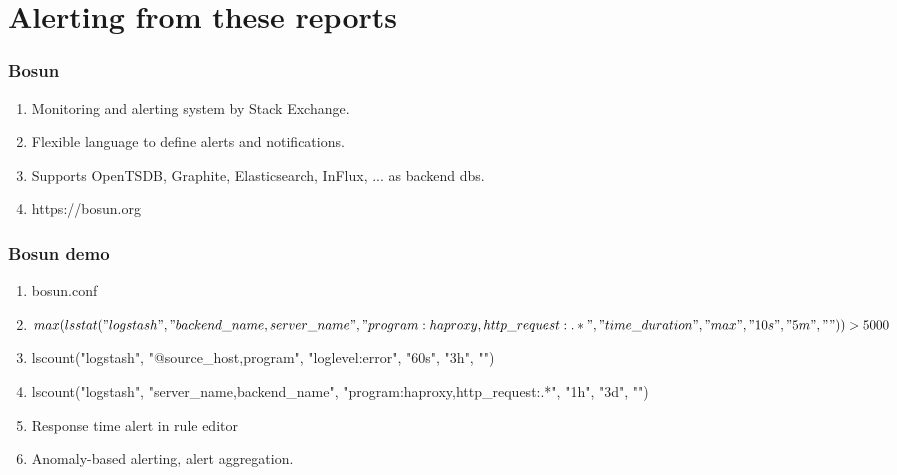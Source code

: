 \documentclass[13pt, ignorenonframetext]{beamer}
\begin{document}
\section{Alerting from these reports}
\begin{frame}
\frametitle{Bosun}
\begin{enumerate}
\item Monitoring and alerting system by Stack Exchange.
\item Flexible language to define alerts and notifications.
\item Supports OpenTSDB, Graphite, Elasticsearch, InFlux, ... as backend dbs.
\item https://bosun.org
\end{enumerate}
\end{frame}


\begin{frame}
\frametitle{Bosun demo}
\begin{enumerate}
\item bosun.conf
\item $ max(lsstat("logstash", "backend\_name,server\_name", "program:haproxy,http\_request:.*", "time\_duration", "max", "10s", "5m", "")) > 5000 $
\item lscount("logstash", "@source\_host,program", "loglevel:error", "60s", "3h", "")
\item lscount("logstash", "server\_name,backend\_name", "program:haproxy,http\_request:.*", "1h", "3d", "")
\item Response time alert in rule editor
\item Anomaly-based alerting, alert aggregation.
\end{enumerate}
\end{frame}
\end{document}
